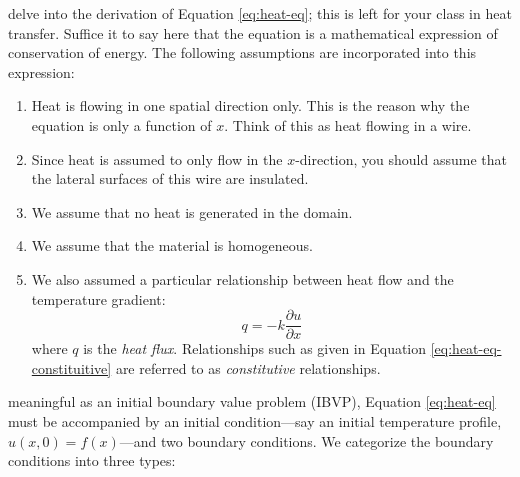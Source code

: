  delve into the derivation of Equation \ref{eq:heat-eq}; this is left for your class in heat transfer.  Suffice it to say here that the equation is a mathematical expression of conservation of energy.  The following assumptions are incorporated into this expression:
\begin{enumerate}
\item Heat is flowing in one spatial direction only.  This is the reason why the equation is only a function of $x$.  Think of this as heat flowing in a wire.
\item Since heat is assumed to only flow in the $x$-direction, you should assume that the lateral surfaces of this wire are insulated.  
\item We assume that no heat is generated in the domain.
\item We assume that the material is homogeneous.
\item We also assumed a particular relationship between heat flow and the temperature gradient:
\begin{equation}
q = -k\frac{\partial u}{\partial x}
\label{eq:heat-eq-constituitive}
\end{equation}
where $q$ is the \emph{heat flux}.  Relationships such as given in Equation \ref{eq:heat-eq-constituitive} are referred to as \emph{constitutive} relationships.
\end{enumerate}  

 meaningful as an initial boundary value problem (IBVP), Equation \ref{eq:heat-eq} must be accompanied by an initial condition---say an initial temperature profile, $u(x,0) = f(x)$---and two boundary conditions.  We categorize the boundary conditions into three types:

